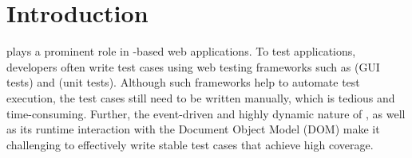 \section{Introduction} \label{Sec:intro}

\javascript plays a prominent role in \javascript-based web applications. To test \javascript applications, developers often write test cases using web testing frameworks such as \selenium (GUI tests) and \qunit (\javascript unit tests). Although such frameworks help to automate test execution, the test cases still need to be written manually, which is tedious and time-consuming. 
Further, the event-driven and highly dynamic nature of \javascript, as well as its runtime interaction with the Document Object Model (DOM) make it challenging to effectively write stable test cases that achieve high coverage. %
%
%
%

